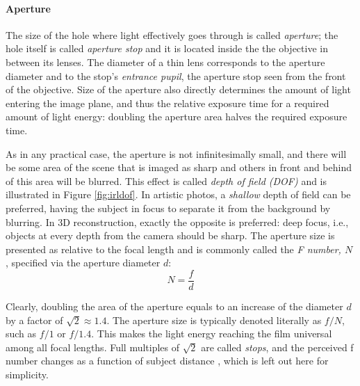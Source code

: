 
\paragraph{Aperture}
The size of the hole where light effectively goes through is called \emph{aperture}; the hole itself is called \emph{aperture stop} and it is located inside the the objective in between its lenses.
The diameter of a thin lens corresponds to the aperture diameter and to the stop's \emph{entrance pupil}, the aperture stop seen from the front of the objective.
Size of the aperture also directly determines the amount of light entering the image plane, and thus the relative exposure time for a required amount of light energy: doubling the aperture area halves the required exposure time.
\cite[ch.~13]{greenleaf1950photographic}

As in any practical case, the aperture is not infinitesimally small, and there will be some area of the scene that is imaged as sharp and others in front and behind of this area will be blurred.
This effect is called \emph{depth of field (DOF)} and is illustrated in Figure \ref{fig:irldof}.
In artistic photos, a \emph{shallow} depth of field can be preferred, having the subject in focus to separate it from the background by blurring.
In 3D reconstruction, exactly the opposite is preferred: deep focus, i.e., objects at every depth from the camera should be sharp.
The aperture size is presented as relative to the focal length and is commonly called the \emph{F number, $N$} \cite[p.~23]{greenleaf1950photographic}, specified via the aperture diameter $d$:
\begin{equation} \label{eq:fnumber}
	N = \frac{f}{d}
\end{equation}

Clearly, doubling the area of the aperture equals to an increase of the diameter $d$ by a factor of $\sqrt 2 \approx 1.4$.
The aperture size is typically denoted literally as $f/N$, such as $f/1$ or $f/1.4$.
This makes the light energy reaching the film universal among all focal lengths.
Full multiples of $\sqrt 2$ are called \emph{stops}, and the perceived f number changes as a function of subject distance \cite[p.~23]{greenleaf1950photographic}, which is left out here for simplicity.


